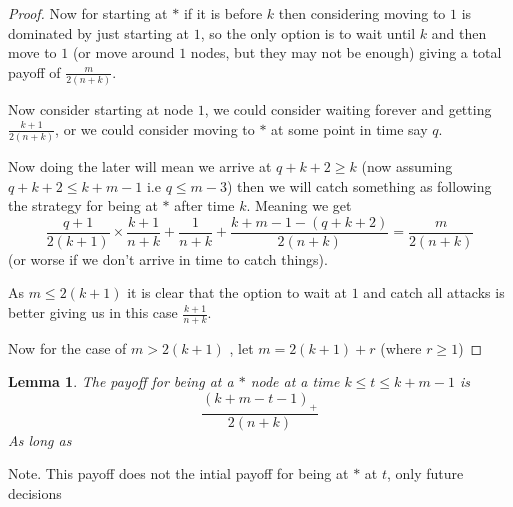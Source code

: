 \documentclass[a4paper,10pt]{article}
\newcommand{\pospart}[1]{\left( #1 \right)_{+}}
\newtheorem{lemma}[theorem]{Lemma}
\theoremstyle{definition}
\theoremstyle{definition}
\theoremstyle{remark}
\theoremstyle{definition}
\begin{document}
\begin{proof}
Now for starting at $*$ if it is before $k$ then considering moving to $1$ is dominated by just starting at $1$, so the only option is to wait until $k$ and then move to $1$ (or move around $1$ nodes, but they may not be enough) giving a total payoff of $\frac{m}{2(n+k)}$.

Now consider starting at node $1$, we could consider waiting forever and getting $\frac{k+1}{2(n+k)}$, or we could consider moving to $*$ at some point in time say $q$.

Now doing the later will mean we arrive at $q+k+2 \geq k$ (now assuming $q+k+2 \leq k+m-1$ i.e $q \leq m-3$) then we will catch something as following the strategy for being at $*$ after time $k$.
Meaning we get
$$\frac{q+1}{2(k+1)} \times \frac{k+1}{n+k}+\frac{1}{n+k}+\frac{k+m-1-(q+k+2)}{2(n+k)}=\frac{m}{2(n+k)}$$
(or worse if we don't arrive in time to catch things).

As $m \leq 2(k+1)$ it is clear that the option to wait at $1$ and catch all attacks is better giving us in this case $\frac{k+1}{n+k}$.

Now for the case of $m > 2(k+1)$ , let $m=2(k+1)+r$ (where $r \geq 1$)
\end{proof}

\begin{lemma}
The payoff for being at a $*$ node at a time $k \leq t \leq k+m-1$ is
$$\frac{\pospart{k+m-t-1}}{2(n+k)}$$
As long as 
\end{lemma}
Note. This payoff does not the intial payoff for being at $*$ at $t$, only future decisions
\end{document}
